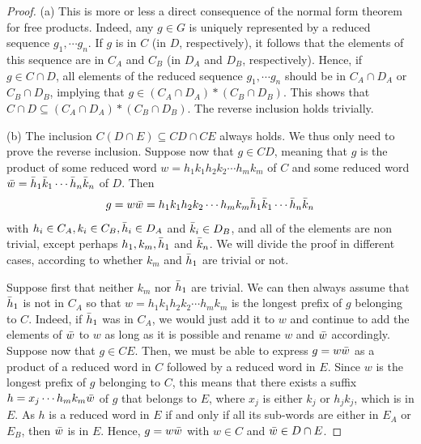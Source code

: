 \documentclass[11pt,letterpaper]{amsart}
\begin{document}
\begin{proof}
    (a) This is more or less a direct consequence of the normal form theorem for free products. Indeed, any $g \in G$ is uniquely represented by a reduced sequence $g_1, \cdots g_n$. If $g$ is in $C$ (in $D$, respectively), it follows that the elements of this sequence are in $C_A$ and $C_B$ (in $D_A$ and $D_B$, respectively).
    Hence, if $g \in C \cap D$, all elements of the reduced sequence $g_1, \cdots g_n$ should be in $C_A \cap D_A$ or $C_B \cap D_B$, implying that $g \in (C_A \cap D_A) * (C_B \cap D_B)$. This shows that $C \cap D \subseteq (C_A \cap D_A) * (C_B \cap D_B)$. The reverse inclusion holds trivially.


    (b) The inclusion $C(D \cap E) \subseteq CD \cap CE$ always holds. We thus only need to prove the reverse inclusion. Suppose now that $g \in CD$, meaning that $g$ is the product of some reduced word $w = h_1k_1h_2k_2 \cdots h_mk_m$ of $C$ and some reduced word $\Bar{w} =\Bar{h}_1\Bar{k}_1 \cdots \Bar{h}_n\Bar{k}_n$ of $D$. Then $$g = w \Bar{w} = h_1k_1h_2k_2 \cdots h_mk_m \Bar{h}_1\Bar{k}_1 \cdots \Bar{h}_n\Bar{k}_n$$ with $h_i \in C_A, k_i \in C_B, \Bar{h}_i \in D_A$ and $\Bar{k}_i \in D_B$, and all of the elements are non trivial, except perhaps $h_1,k_m,\Bar{h}_1$ and $\Bar{k}_n$. We will divide the proof in different cases, according to whether $k_m$ and $\Bar{h}_1$ are trivial or not.
    
    Suppose first that neither $k_m$ nor $\Bar{h}_1$ are trivial. We can then always assume that $\Bar{h}_1$ is not in $C_A$ so that $w = h_1k_1h_2k_2 \cdots h_mk_m$ is the longest prefix of $g$ belonging to $C$. Indeed, if $\Bar{h}_1$ was in $C_A$, we would just add it to $w$ and continue to add the elements of $\Bar{w}$ to $w$ as long as it is possible and rename $w$ and $\Bar{w}$ accordingly. Suppose now that $g \in CE$. Then, we must be able to express $g =w\Bar{w}$ as a product of a reduced word in $C$ followed by a reduced word in $E$. Since $w$ is the longest prefix of $g$ belonging to $C$, this means that there exists a suffix $h =x_j \cdots h_mk_m \Bar{w}$ of $g$ that belongs to $E$, where $x_j$ is either $k_j$ or $h_jk_j$, which is in $E$. As $h$ is a reduced word in $E$ if and only if all its sub-words are either in $E_A$ or $E_B$, then $\Bar{w}$ is in $E$. Hence, $g = w \Bar{w}$ with $w \in C$ and $\Bar{w} \in D \cap E$.


\end{proof}
\end{document}
